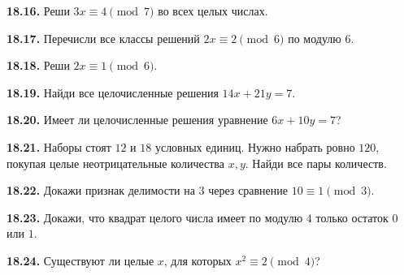 \noindent\begin{minipage}[t]{\linewidth}\textbf{18.16.} Реши \(3x\equiv4\pmod7\) во всех целых числах.\par\end{minipage}\par
\noindent\begin{minipage}[t]{\linewidth}\textbf{18.17.} Перечисли все классы решений \(2x\equiv2\pmod6\) по модулю \(6\).\par\end{minipage}\par
\noindent\begin{minipage}[t]{\linewidth}\textbf{18.18.} Реши \(2x\equiv1\pmod6\).\par\end{minipage}\par
\noindent\begin{minipage}[t]{\linewidth}\textbf{18.19.}\starmark{} Найди все целочисленные решения \(14x+21y=7\).\par\end{minipage}\par
\noindent\begin{minipage}[t]{\linewidth}\textbf{18.20.} Имеет ли целочисленные решения уравнение \(6x+10y=7\)?\par\end{minipage}\par
\noindent\begin{minipage}[t]{\linewidth}\textbf{18.21.}\starmark{} Наборы стоят \(12\) и \(18\) условных единиц. Нужно набрать ровно \(120\), покупая целые неотрицательные количества \(x,y\). Найди все пары количеств.\par\end{minipage}\par
\noindent\begin{minipage}[t]{\linewidth}\textbf{18.22.} Докажи признак делимости на \(3\) через сравнение \(10\equiv1\pmod3\).\par\end{minipage}\par
\noindent\begin{minipage}[t]{\linewidth}\textbf{18.23.} Докажи, что квадрат целого числа имеет по модулю \(4\) только остаток \(0\) или \(1\).\par\end{minipage}\par
\noindent\begin{minipage}[t]{\linewidth}\textbf{18.24.} Существуют ли целые \(x\), для которых \(x^2\equiv2\pmod4\)?\par\end{minipage}\par
